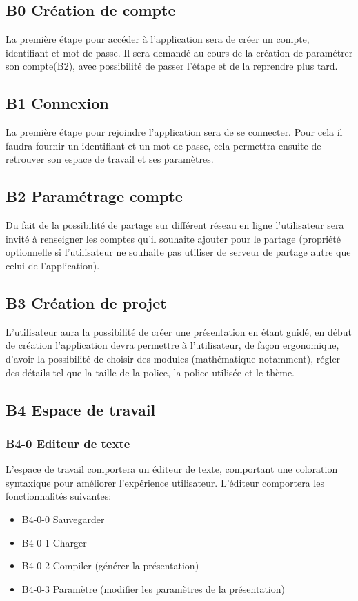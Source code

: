 \documentclass[11pt,a4paper,svgnames]{article}
\begin{document}
\subsection{B0 Création de compte}
La première étape pour accéder à l'application sera de créer un compte, identifiant et mot de passe. Il sera demandé au cours de la création de paramétrer son compte(B2), avec possibilité de passer l'étape et de la reprendre plus tard.

\subsection{B1 Connexion}
La première étape pour rejoindre l'application sera de se connecter. Pour cela il faudra fournir un identifiant et un mot de passe, cela permettra ensuite de retrouver son espace de travail et ses paramètres.

\subsection{B2 Paramétrage compte}
Du fait de la possibilité de partage sur différent réseau en ligne l'utilisateur sera invité à renseigner les comptes qu'il souhaite ajouter pour le partage (propriété optionnelle si l'utilisateur ne souhaite pas utiliser de serveur de partage autre que celui de l'application).

\subsection{B3 Création de projet}
L'utilisateur aura la possibilité de créer une présentation en étant guidé, en début de création l'application devra permettre à l'utilisateur, de façon ergonomique, d'avoir la possibilité de choisir des modules (mathématique notamment), régler des détails tel que la taille de la police, la police utilisée et le thème.

\subsection{B4 Espace de travail}
\subsubsection{B4-0 Editeur de texte}
L'espace de travail comportera un éditeur de texte, comportant une coloration syntaxique pour améliorer l'expérience utilisateur. L'éditeur comportera les fonctionnalités suivantes:
\begin{itemize}
\item B4-0-0 Sauvegarder
\item B4-0-1 Charger
\item B4-0-2 Compiler (générer la présentation) 
\item B4-0-3 Paramètre (modifier les paramètres de la présentation)
\end{itemize}
\end{document}

